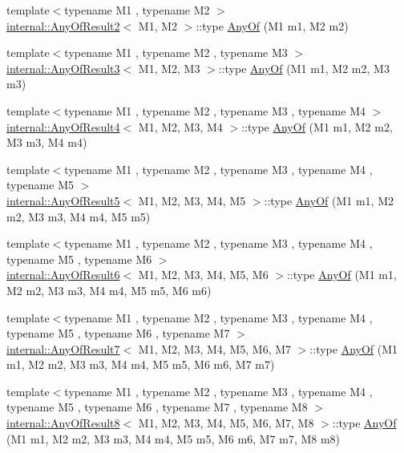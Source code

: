 \begin{DoxyCompactItemize}
\item 
{\footnotesize template$<$typename M1 , typename M2 $>$ }\\\hyperlink{structtesting_1_1internal_1_1_any_of_result2}{internal\+::\+Any\+Of\+Result2}$<$ M1, M2 $>$\+::type \hyperlink{namespacetesting_a81cfefd9f75cdce827d5bc873cf73aac}{Any\+Of} (M1 m1, M2 m2)
\item 
{\footnotesize template$<$typename M1 , typename M2 , typename M3 $>$ }\\\hyperlink{structtesting_1_1internal_1_1_any_of_result3}{internal\+::\+Any\+Of\+Result3}$<$ M1, M2, M3 $>$\+::type \hyperlink{namespacetesting_a3ccbde3ba01189587676d44a4333c0a5}{Any\+Of} (M1 m1, M2 m2, M3 m3)
\item 
{\footnotesize template$<$typename M1 , typename M2 , typename M3 , typename M4 $>$ }\\\hyperlink{structtesting_1_1internal_1_1_any_of_result4}{internal\+::\+Any\+Of\+Result4}$<$ M1, M2, M3, M4 $>$\+::type \hyperlink{namespacetesting_a1cfcacf2cf19543b86445e3585d5356f}{Any\+Of} (M1 m1, M2 m2, M3 m3, M4 m4)
\item 
{\footnotesize template$<$typename M1 , typename M2 , typename M3 , typename M4 , typename M5 $>$ }\\\hyperlink{structtesting_1_1internal_1_1_any_of_result5}{internal\+::\+Any\+Of\+Result5}$<$ M1, M2, M3, M4, M5 $>$\+::type \hyperlink{namespacetesting_a049ea436e52c242adc44b2b42dc03e50}{Any\+Of} (M1 m1, M2 m2, M3 m3, M4 m4, M5 m5)
\item 
{\footnotesize template$<$typename M1 , typename M2 , typename M3 , typename M4 , typename M5 , typename M6 $>$ }\\\hyperlink{structtesting_1_1internal_1_1_any_of_result6}{internal\+::\+Any\+Of\+Result6}$<$ M1, M2, M3, M4, M5, M6 $>$\+::type \hyperlink{namespacetesting_a747189264a49a426004366371f1a2575}{Any\+Of} (M1 m1, M2 m2, M3 m3, M4 m4, M5 m5, M6 m6)
\item 
{\footnotesize template$<$typename M1 , typename M2 , typename M3 , typename M4 , typename M5 , typename M6 , typename M7 $>$ }\\\hyperlink{structtesting_1_1internal_1_1_any_of_result7}{internal\+::\+Any\+Of\+Result7}$<$ M1, M2, M3, M4, M5, M6, M7 $>$\+::type \hyperlink{namespacetesting_a754d1bddb237e79613f6834af3329efa}{Any\+Of} (M1 m1, M2 m2, M3 m3, M4 m4, M5 m5, M6 m6, M7 m7)
\item 
{\footnotesize template$<$typename M1 , typename M2 , typename M3 , typename M4 , typename M5 , typename M6 , typename M7 , typename M8 $>$ }\\\hyperlink{structtesting_1_1internal_1_1_any_of_result8}{internal\+::\+Any\+Of\+Result8}$<$ M1, M2, M3, M4, M5, M6, M7, M8 $>$\+::type \hyperlink{namespacetesting_a9c979c62cc004664b14e0ce444e531d5}{Any\+Of} (M1 m1, M2 m2, M3 m3, M4 m4, M5 m5, M6 m6, M7 m7, M8 m8)

\end{DoxyCompactItemize}
